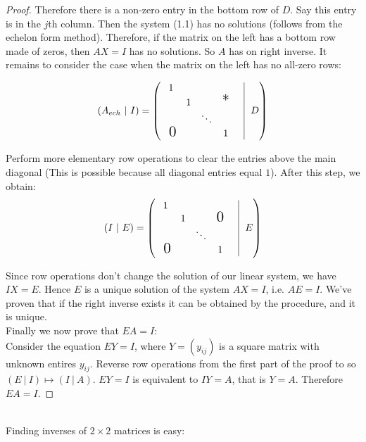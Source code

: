 \begin{proof}
Therefore there is a non-zero entry in the bottom row of $D$. Say this entry is in the $j$th column. Then the system (1.1) has no solutions (follows from the echelon form method). Therefore, if the matrix on the left has a bottom row made of zeros, then $AX = I$ has no solutions. So $A$ has on right inverse. It remains to consider the case when the matrix on the left has no all-zero rows:

\[(A_{ech} ~|~ I) =\left(
    \begin{array}{ccccc |}
    1    &       &    &     & \\ 
  & 1       &    &  \scalebox{1.5}{*}   & \\ 
          &    & \ddots     &    & \\ 
       ~\scalebox{1.5}{$0$}   &  &  & 1     &  \\ 
  \end{array} ~~D \right) \]
  
 Perform more elementary row operations to clear the entries above the main diagonal (This is possible because all diagonal entries equal $1$). After this step, we obtain: 
\[(I~|~ E) =\left(
    \begin{array}{ccccc |}
    1    &       &    &     & \\ 
  & 1       &    &  \scalebox{1.5}{$0$}   & \\ 
          &    & \ddots     &    & \\ 
       ~\scalebox{1.5}{$0$}   &  &  & 1     &  \\ 
  \end{array} ~~E \right) \]
  
  Since row operations don't change the solution of our linear system, we have $IX = E$. Hence $E$ is a unique solution of the system $AX = I$, i.e. $AE = I$. We've proven that if the right inverse exists it can be obtained by the procedure, and it is unique.\\
  
   \noindent Finally we now prove that $EA = I$:\\
 
   Consider the equation $EY = I$, where $Y = (y_{ij})$ is a square matrix with unknown entires $y_{ij}$.  Reverse row operations from the first part of the proof to so $(E ~|~ I) \mapsto (I ~|~ A)$.  $EY = I$ is equivalent to $IY = A$, that is $Y = A$. Therefore $EA = I$. 
\end{proof}~\\

Finding inverses of $2 \times 2$ matrices is easy: 

